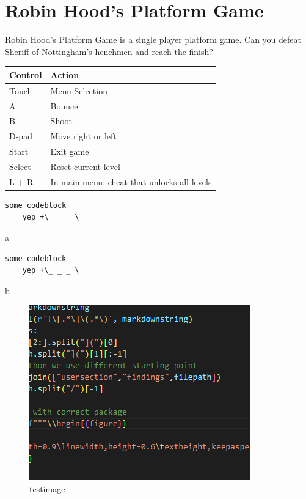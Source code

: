 

\chapter{Robin Hood's Platform Game}

Robin Hood's Platform Game is a single player platform game.
Can you defeat Sheriff of Nottingham's henchmen and reach the finish?



\vspace{9pt}
\begin{tabularx}{\textwidth}{XX}
	 Control  &  Action               \tabularnewline\hline
	 Touch    &  Menu Selection       \tabularnewline
	 A        &  Bounce               \tabularnewline
	 B        &  Shoot                \tabularnewline
	 D-pad    &  Move right or left   \tabularnewline
	 Start    &  Exit game            \tabularnewline
	 Select   &  Reset current level  \tabularnewline
	 L + R    &  In main menu: cheat that unlocks all levels 
\end{tabularx}
\vspace{9pt}

\begin{verbatim}
some codeblock
	yep +\_ _ _ \
\end{verbatim}

a

\begin{verbatim}
some codeblock
	yep +\_ _ _ \
\end{verbatim}

b

\begin{figure}[H]
	\centering
	\includegraphics[width=0.9\linewidth,height=0.6\textheight,keepaspectratio=true]{Beispieldateien/images/2022-06-22-23-56-25.png}
	\caption{testimage}
	\label{2022-06-22-23-56-25.png}
\end{figure}
        


